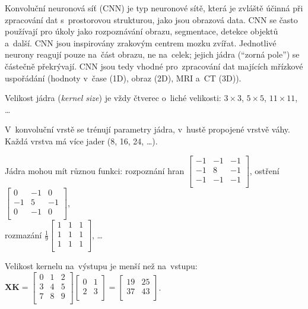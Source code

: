 Konvoluční neuronová síť (CNN) je typ neuronové sítě, která je zvláště účinná při zpracování dat s~prostorovou strukturou, jako jsou obrazová data. CNN se často používají pro úkoly jako rozpoznávání obrazu, segmentace, detekce objektů a~další. CNN jsou inspirovány zrakovým centrem mozku zvířat.
Jednotlivé neurony reagují pouze na~část obrazu, ne na~celek; jejich jádra (\enquote{zorná pole}) se částečně překrývají.
CNN jsou tedy vhodné pro~zpracování dat majících mřízkové uspořádání (hodnoty v~čase (1D), obraz (2D), MRI a~CT (3D)).

Velikost jádra (\emph{kernel size}) je vždy čtverec o~liché velikosti: $3\times3$, $5 \times 5$, $11 \times 11$, \dots

V~konvoluční vrstě se trénují parametry jádra, v~hustě propojené vrstvě váhy.
Každá vrstva má více jader (8, 16, 24, \dots).

Jádra mohou mít různou funkci:
rozpoznání hran $\left[ \begin{matrix}
            -1 & -1 & -1 \\
            -1 & 8  & -1 \\
            -1 & -1 & -1 \\
        \end{matrix} \right]$,
ostření $\left[ \begin{matrix}
            0  & -1 & 0  \\
            -1 & 5  & -1 \\
            0  & -1 & 0  \\
        \end{matrix} \right]$,
\\
rozmazání $\frac{1}{9} \left[ \begin{matrix}
            1 & 1 & 1 \\
            1 & 1 & 1 \\
            1 & 1 & 1 \\
        \end{matrix} \right]$,
\dots

Velikost kernelu na~výstupu je menší než na~vstupu:
$\mathbf{X} \mathbf{K} = \left[ \begin{matrix}
            0 & 1 & 2 \\
            3 & 4 & 5 \\
            7 & 8 & 9 \\
        \end{matrix} \right] \left[ \begin{matrix}
            0 & 1 \\
            2 & 3 \\
        \end{matrix} \right] = \left[ \begin{matrix}
            19 & 25 \\
            37 & 43 \\
        \end{matrix} \right]$.

